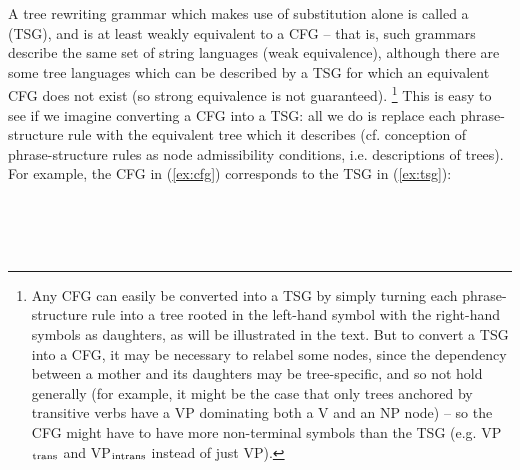\documentclass[output=paper,hidelinks]{langscibook}
\begin{document}
\ea\label{ex:substitution-derivation}
\z

A tree rewriting grammar which makes use of substitution alone is called a
 (TSG), and is at least weakly equivalent to a CFG
-- that is, such grammars describe the same set of string languages (weak
equivalence), although there are some tree languages which can be
described by a TSG for which an equivalent CFG does not exist (so strong
equivalence is not guaranteed).%
%
\footnote{Any CFG can easily be converted into a TSG by simply turning each
  phrase-structure rule into a tree rooted in the left-hand symbol with the
  right-hand symbols as daughters, as will be illustrated in the text. But to
  convert a TSG into a CFG, it may be necessary to relabel some nodes, since the
  dependency between a mother and its daughters may be tree-specific, and so not
  hold generally (for example, it might be the case that only trees anchored by
  transitive verbs have a VP dominating both a V and an NP node) -- so the CFG
  might have to have more non-terminal symbols than the TSG (e.g.
  VP$_\textnormal{trans}$ and VP$_\textnormal{intrans}$ instead of just VP).}
%
This is easy to see if we imagine converting a CFG into a TSG: all we do is
replace each phrase-structure rule with the equivalent tree which it describes
(cf.  conception of phrase-structure rules as node
admissibility conditions, i.e. descriptions of trees). For example, the CFG in
(\ref{ex:cfg}) corresponds to the TSG in (\ref{ex:tsg}):

\ea\label{ex:cfg}
\\
\\
\\
\z
\end{document}
